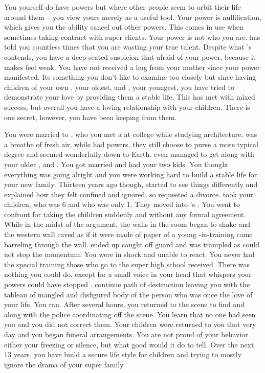 \documentclass[char]{LRSguildcamp1}
\begin{document}
You yourself do have powers but where other people seem to orbit their life around them -- you view yours merely as a useful tool. Your power is nullification, which gives you the ability cancel out other powers. This comes in use when sometimes taking contract with super clients. Your power is not who you are. \cGrandma{} has told you countless times that you are wasting your true talent. Despite what \cGrandma{} 's contends, you have a deep-seated suspicion that \cGrandma{\theyare} afraid of your power, because it makes \cGrandma{\them} feel weak. You have not received a hug from your mother since your power manifested. Its something you don't like to examine too closely but since having children of your own \cTeen{}, your oldest, and \cTween{}, your youngest, you have tried to demonstrate your love by providing them a stable life. This has met with mixed success, but overall you have a loving relationship with your children.  There is one secret, however, you have been keeping from them. 

You were married to \cAS{}, who you met a at college while studying architecture. \cAS{} was a breathe of fresh air, while \cAS{\they} had powers, they still choose to purse a more typical degree and seemed wonderfully down to Earth. \cAS{} even managed to get along with your older \cOldest{\sibling}, \cOldest{} and \cOldest{\their} \cOS{\spouse} \cOS{}. You got married and had your two kids. You thought everything was going alright and you were working hard to build a stable life for your new family.  Thirteen years ago though, \cAS{} started to see things differently and \cAS{\they} explained how they felt confined and ignored, so requested a divorce. \cAS{} took your children, \cTeen{} who was 6 and \cTween{} who was only 1. They moved into \cOldest{}'s . You went to confront \cAS{} for taking the children suddenly and without any formal agreement.  While in the midst of the argument, the walls in the room began to shake and the western wall caved as if it were made of paper of a young \cJuggernaut{\hero}-in-training \cJuggernaut{} came barreling through the wall. \cAS{} ended up caught off guard and was trampled as \cJuggernaut{} could not stop the momentum. You were in shock and unable to react. You never had the special training those who go to the super high school received. There was nothing you could do, except for a small voice in your head that whispers your powers could have stopped \cJuggernaut{}. \cJuggernaut{} continue \cJuggernaut{\their} path of destruction leaving you with the tableau of mangled and disfigured body of the person who was once the love of your life. You ran. After several hours, you returned to the scene to find \cOS{} and \cOldest{} along with the police coordinating off the scene. You learn that no one had seen you and you did not correct them. Your children were returned to you that very day and you began funeral arrangements. You are not proud of your behavior either your freezing or silence, but what good would it do to tell. Over the next 13 years, you have build a secure life style for children and trying to mostly ignore the drama of your super family. 
\end{document}
